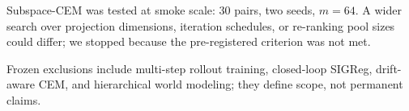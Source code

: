 Subspace-CEM was tested at smoke scale: 30 pairs, two seeds, $m=64$. A wider search over projection dimensions, iteration schedules, or re-ranking pool sizes could differ; we stopped because the pre-registered criterion was not met.

Frozen exclusions include multi-step rollout training, closed-loop SIGReg, drift-aware CEM, and hierarchical world modeling; they define scope, not permanent claims.
